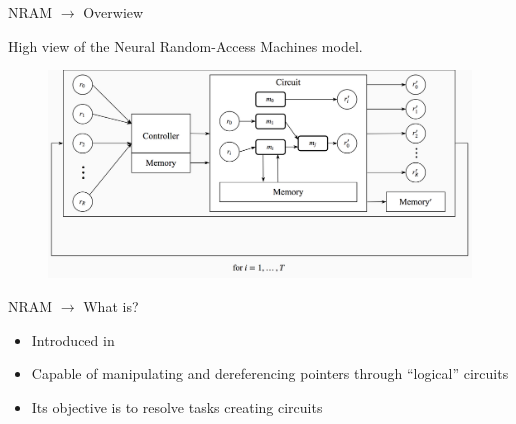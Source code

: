 \documentclass[xcolor={usenames}]{beamer}
\begin{document}
  \begin{frame}{NRAM \(\rightarrow\) Overwiew}

  	High view of the Neural Random-Access Machines model.
  	\begin{figure}
  		\centering
  		\includegraphics[width=\textwidth]{../figures/nram-diagram.png}
  	\end{figure}
  \end{frame}
  \iffalse
  \begin{frame}{NRAM \(\rightarrow\) What is?}
  	\begin{itemize}
  		\item{Introduced in \cite{NRAM:2016}}
  		\item{Capable of manipulating and dereferencing pointers through ``logical'' circuits}
  		\item{Its objective is to resolve tasks creating circuits}
  	\end{itemize}
  \end{frame}
  
\end{document}
